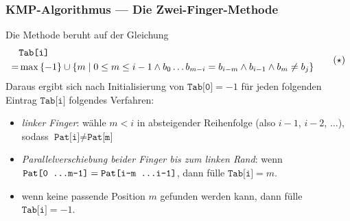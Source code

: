 \documentclass{beamer}
\begin{document}
\begin{frame} \frametitle{KMP-Algorithmus --- Die Zwei-Finger-Methode}
	Die Methode beruht auf der Gleichung
	\begin{equation*}
		\begin{aligned}
		\small
		&\texttt{Tab[i]} \\
		= &\max \left\{ -1 \right\} \cup \left\{ m \mid 0 \le m \le i-1 \land b_0 \dots b_{m-i} = b_{i-m} \land b_{i-1} \land b_m \neq b_j \right\}
		\end{aligned} \tag{$\star$} \label{eq: kmp}
	\end{equation*}
	Daraus ergibt sich nach Initialisierung von $\texttt{Tab[0]} = -1$ für jeden folgenden Eintrag $\texttt{Tab[i]}$ folgendes Verfahren:
	\begin{itemize}
		\item \textit{linker Finger}: wähle $m < i$ in absteigender Reihenfolge (also $i-1$, $i-2$, $\dots$), sodass $\texttt{Pat[i]} \neq \texttt{Pat[m]}$
		\item \textit{Parallelverschiebung beider Finger bis zum linken Rand}: wenn $\texttt{Pat[0 \dots m-1]} = \texttt{Pat[i-m \dots i-1]}$, dann fülle $\texttt{Tab[i]} = m$.
		\item wenn keine passende Position $m$ gefunden werden kann, dann fülle $\texttt{Tab[i]} = -1$.
	\end{itemize}
\end{frame}
\end{document}
